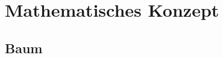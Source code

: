 \section{Mathematisches Konzept}
\label{sec:2methoden}
%
%
%

\subsection{Baum}
\label{sec:2methoden}
%
%
%
%
%
%
%
%
%
%
%
%
%
%
